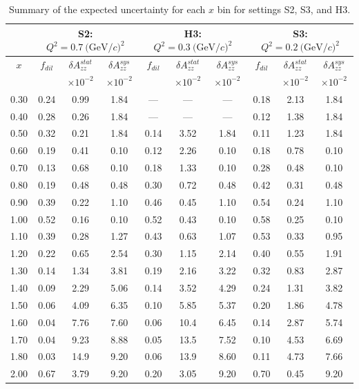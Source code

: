 \begin{table}
\begin{center}
\begin{tabular}{c|ccc|ccc|ccc}
 ~ & \multicolumn{3}{|c}{S2: $Q^2=0.7\mathrm{~(GeV/}c)^2$} & \multicolumn{3}{|c}{H3: $Q^2=0.3\mathrm{~(GeV/}c)^2$} & \multicolumn{3}{|c}{S3: $Q^2=0.2\mathrm{~(GeV/}c)^2$} \\
 \hline
  $x$  & $f_{dil}$ & $\delta A_{zz}^{stat}$ & $\delta A_{zz}^{sys}$ & $f_{dil}$ & $\delta A_{zz}^{stat}$ & $\delta A_{zz}^{sys}$ & $f_{dil}$ & $\delta A_{zz}^{stat}$ & $\delta A_{zz}^{sys}$ \\
  &     & $\times 10^{-2}$  & $\times 10^{-2}$  &    & $\times 10^{-2}$  & $\times 10^{-2}$ &    & $\times 10^{-2}$  & $\times 10^{-2}$ \\
\hline\hline
 0.30   &  0.24	 & 0.99	& 1.84	& ---	& ---	& ---	& 0.18	& 2.13	& 1.84 \\
 0.40   &  0.28	 & 0.26	& 1.84	& ---	& ---	& ---	& 0.12	& 1.38	& 1.84 \\
 0.50   &  0.32	 & 0.21	& 1.84	& 0.14	& 3.52	& 1.84	& 0.11	& 1.23	& 1.84 \\
 0.60   &  0.19	 & 0.41	& 0.10	& 0.12	& 2.26	& 0.10	& 0.18	& 0.78	& 0.10 \\ 
 0.70   &  0.13	 & 0.68	& 0.10	& 0.18	& 1.33	& 0.10	& 0.28	& 0.48	& 0.10 \\
 0.80	&  0.19	 & 0.48	& 0.48	& 0.30	& 0.72	& 0.48	& 0.42	& 0.31	& 0.48 \\
 0.90	&  0.39	 & 0.22 	& 1.10 	& 0.46	& 0.45	& 1.10	& 0.54	& 0.24	& 1.10 \\
 1.00	&  0.52	 & 0.16	& 0.10 	& 0.52	& 0.43	& 0.10	& 0.58	& 0.25	& 0.10 \\
 1.10	&  0.39	 & 0.28	& 1.27 	& 0.43	& 0.63	& 1.07	& 0.53	& 0.33	& 0.95 \\
 1.20	&  0.22	 & 0.65	& 2.54 	& 0.30	& 1.15	& 2.14	& 0.40	& 0.55	& 1.91 \\
 1.30	&  0.14	 & 1.34	& 3.81 	& 0.19	& 2.16	& 3.22	& 0.32	& 0.83	& 2.87 \\
 1.40	&  0.09	 & 2.29	& 5.06 	& 0.14	& 3.52	& 4.29	& 0.24	& 1.31	& 3.82 \\
 1.50	&  0.06	 & 4.09	& 6.35	& 0.10	& 5.85	& 5.37	& 0.20	& 1.86	& 4.78 \\
 1.60	&  0.04	 & 7.76	& 7.60 	& 0.06	& 10.4	& 6.45	& 0.14	& 2.87	& 5.74 \\
 1.70	&  0.04	 & 9.23	& 8.88 	& 0.05	& 13.5	& 7.52	& 0.10	& 4.53	& 6.69 \\
 1.80	&  0.03	 & 14.9	& 9.20 	& 0.06	& 13.9	& 8.60	& 0.11	& 4.73	& 7.66 \\
 2.00   &  0.67	 & 3.79	& 9.20	& 0.20	& 3.05	& 9.20	& 0.70	& 0.45	& 9.20 \\
\hline\hline
\end{tabular}
\caption{\label{RATES3}Summary of the expected uncertainty for each $x$ bin for settings S2, S3, and H3. }
\end{center}
\end{table}


